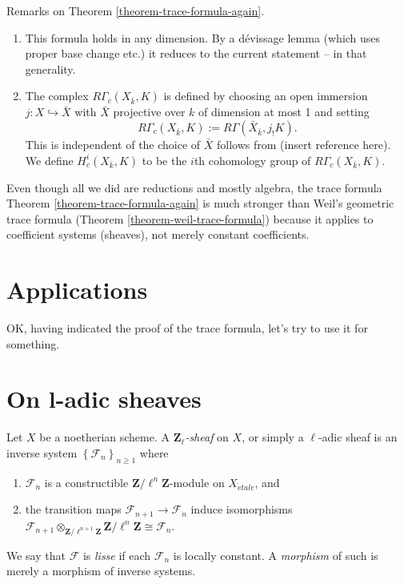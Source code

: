 \begin{remark}
\label{remark-on-trace-formula-again}
Remarks on Theorem \ref{theorem-trace-formula-again}.
\begin{enumerate}
\item
This formula holds in any dimension. By a d\'evissage lemma (which uses proper
base change etc.) it reduces to the current statement -- in that generality.
\item
The complex $R\Gamma_c(X_{\bar k}, K)$ is defined by choosing an open immersion
$j: X \hookrightarrow \bar X$ with $\bar X$ projective over $k$ of dimension at
most 1 and setting
$$
R\Gamma_c(X_{\bar k}, K) := R\Gamma(\bar X_{\bar k}, j_!K).
$$
This is independent of the choice of $\bar X$ follows from
(insert reference here). We define $H^i_c(X_{\bar k}, K)$
to be the $i$th cohomology group of $R\Gamma_c(X_{\bar k}, K)$.
\end{enumerate}
\end{remark}

\begin{remark}
\label{remark-stronger}
Even though all we did are reductions and mostly algebra, the trace formula
Theorem \ref{theorem-trace-formula-again} is much stronger than
Weil's geometric trace formula (Theorem \ref{theorem-weil-trace-formula})
because it applies to coefficient
systems (sheaves), not merely constant coefficients.
\end{remark}


\section{Applications}
\label{section-applications}

\noindent
OK, having indicated the proof of the trace formula, let's try to use it
for something.





\section{On l-adic sheaves}
\label{section-l-adic-sheaves}

\begin{definition}
\label{definition-l-adic-sheaf}
Let $X$ be a noetherian scheme. A
{\it $\mathbf{Z}_\ell$-sheaf} on $X$, or simply a
{$\ell$-adic sheaf} is an
inverse system $\left\{\mathcal{F}_n\right\}_{n\geq 1}$ where
\begin{enumerate}
\item
$\mathcal{F}_n$ is a constructible $\mathbf{Z}/\ell^n\mathbf{Z}$-module on
$X_{\acute{e}tale}$, and
\item
the transition maps $\mathcal{F}_{n+1}\to \mathcal{F}_n$ induce isomorphisms
$\mathcal{F}_{n+1} \otimes_{\mathbf{Z}/\ell^{n+1}\mathbf{Z}}
\mathbf{Z}/\ell^n\mathbf{Z} \cong \mathcal{F}_n$.
\end{enumerate}
We say that $\mathcal{F}$ is {\it lisse} if each $\mathcal{F}_n$ is locally
constant. A {\it morphism} of such is merely a morphism of inverse systems.
\end{definition}

